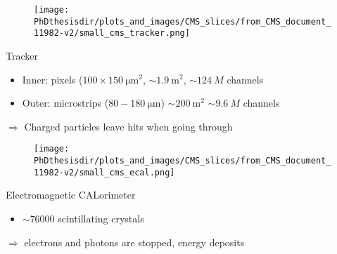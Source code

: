 \begin{frame}
\addtocounter{framenumber}{-1}
\begin{minipage}[t]{.6\textwidth}
\begin{figure}
\texttt{[image: \\PhDthesisdir/plots\_and\_images/CMS\_slices/from\_CMS\_document\_11982-v2/small\_cms\_tracker.png]}
\end{figure}
\end{minipage}
\hfill\begin{minipage}[t]{.35\textwidth}
\begin{block}{Tracker}
\begin{itemize}
\item Inner: pixels ($\num{100}\times\SI{150}{\micro\meter^2}$, $\sim\SI{1.9}{\meter^2}$, $\sim\SI{124}{M}$ channels
\item Outer: microstrips ($\num{80}-\SI{180}{\micro\meter}$) $\sim\SI{200}{\meter^2}$ $\sim\SI{9.6}{M}$ channels
\end{itemize}
\end{block}

\begin{block}{}
$\Rightarrow$ Charged particles leave hits when going through
\end{block}
\end{minipage}
\end{frame}

\begin{frame}
\addtocounter{framenumber}{-1}
\begin{minipage}[t]{.6\textwidth}
\begin{figure}
\texttt{[image: \\PhDthesisdir/plots\_and\_images/CMS\_slices/from\_CMS\_document\_11982-v2/small\_cms\_ecal.png]}
\end{figure}
\end{minipage}
\hfill\begin{minipage}[t]{.35\textwidth}
\begin{block}{Electromagnetic CALorimeter}
\begin{itemize}
\item $\sim\num{76000}$ scintillating  crystals
\end{itemize}
\end{block}

\begin{block}{}
$\Rightarrow$ electrons and photons are stopped, energy deposits
\end{block}
\end{minipage}
\end{frame}

